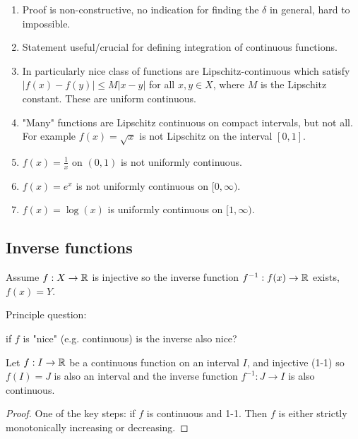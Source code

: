 \documentclass[10pt, a4paper]{article}
\begin{document}
\begin{remark}
    \begin{enumerate}[label = (\roman*)]
        \item Proof is non-constructive,
        no indication for finding the $\delta$ in general,
        hard to impossible.

        \item Statement useful/crucial for defining integration of continuous functions.

        \item In particularly nice class of functions are Lipschitz-continuous which satisfy $|f(x) - f(y)| \leq M|x - y|$ for all $x, y \in X$,
        where $M$ is the Lipschitz constant.
        These are uniform continuous.

        \item "Many" functions are Lipschitz continuous on compact intervals,
        but not all.
        For example $f(x) = \sqrt{x}$ is not Lipschitz on the interval $[0, 1]$.

        \item $f(x) = \frac{1}{x}$ on $(0, 1)$ is not uniformly continuous.

        \item $f(x) = e ^ x$ is not uniformly continuous on $[0, \infty)$.

        \item $f(x) = \log(x)$ is uniformly continuous on $[1, \infty)$.
    \end{enumerate}
\end{remark}

\subsection{Inverse functions}
Assume $f : X \to \mathbb{R}$ is injective so the inverse function $f ^ {-1} : f(x) \to \mathbb{R}$ exists,
$f(x) = Y$.

Principle question:

if $f$ is "nice"
(e.g. continuous)
is the inverse also nice?

\begin{theorem}
    Let $f : I \to \mathbb{R}$ be a continuous function on an interval $I$,
    and injective
    (1-1)
    so $f(I) = J$ is also an interval and the inverse function $f ^ {-1} : J \to I$ is also continuous.

    \begin{proof}
        One of the key steps:
        if $f$ is continuous and 1-1.
        Then $f$ is either strictly monotonically increasing or decreasing.
    \end{proof}
\end{theorem}
\end{document}
